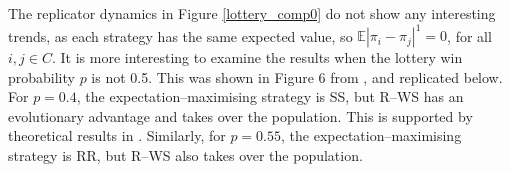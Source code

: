 The replicator dynamics in Figure \ref{lottery_comp0} do not show any interesting trends, as each strategy has the same expected value, so $\mathbb E |\pi_i - \pi_j|^1 = 0$, for all $i,j \in C$. It is more interesting to examine the results when the lottery win probability $p$ is not 0.5. This was shown in Figure 6 from \cite{RN30}, and replicated below. For $p=0.4$, the expectation--maximising strategy is SS, but R--WS has an evolutionary advantage and takes over the population. This is supported by theoretical results in \cite{RN30}. Similarly, for $p=0.55$, the expectation--maximising strategy is RR, but R--WS also takes over the population.